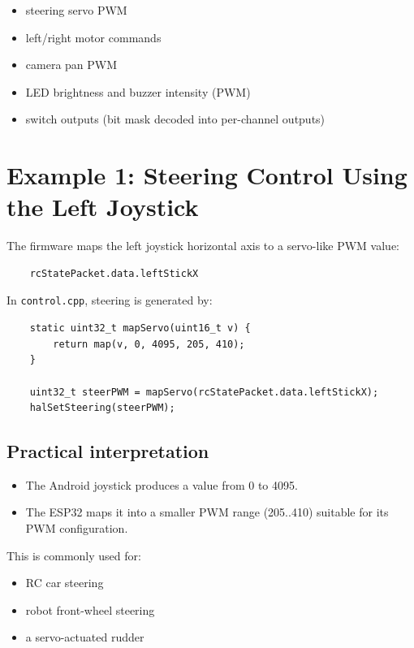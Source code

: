 \begin{itemize}
    \item steering servo PWM
    \item left/right motor commands
    \item camera pan PWM
    \item LED brightness and buzzer intensity (PWM)
    \item switch outputs (bit mask decoded into per-channel outputs)
\end{itemize}

\section{Example 1: Steering Control Using the Left Joystick}
\label{sec:example-steering}

The firmware maps the left joystick horizontal axis to a servo-like PWM value:

\begin{verbatim}
    rcStatePacket.data.leftStickX
\end{verbatim}

In \texttt{control.cpp}, steering is generated by:

\begin{verbatim}
    static uint32_t mapServo(uint16_t v) {
        return map(v, 0, 4095, 205, 410);
    }

    uint32_t steerPWM = mapServo(rcStatePacket.data.leftStickX);
    halSetSteering(steerPWM);
\end{verbatim}

\subsection*{Practical interpretation}
\begin{itemize}
    \item The Android joystick produces a value from 0 to 4095.
    \item The ESP32 maps it into a smaller PWM range (205..410) suitable for its PWM configuration.
\end{itemize}

\noindent This is commonly used for:
\begin{itemize}
    \item RC car steering
    \item robot front-wheel steering
    \item a servo-actuated rudder
\end{itemize}

